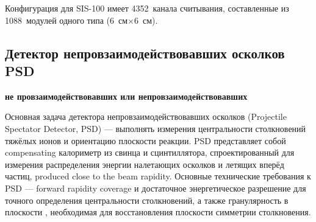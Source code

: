 
Конфигурация для SIS-100 имеет 4352~канала считывания, составленные из 1088~модулей одного типа (6~см$\times$6~см). 


\subsection{Детектор непровзаимодействовавших осколков PSD}\label{sec:secPSD}

\todo \textbf{не провзаимодействовавших или непровзаимодействовавших} \todo

Основная задача детектора непровзаимодействовавших осколков (Projectile Spectator Detector, PSD) --- выполнять измерения центральности столкновений тяжёлых ионов и ориентацию плоскости реакции. PSD представляет собой compensating \todo калориметр из свинца и сцинтиллятора, спроектированный для измерения распределения энергии налетающих осколков и летящих вперёд частиц, produced close to the beam rapidity.
Основные технические требования к PSD --- forward rapidity coverage и достаточное энергетическое разрешение для точного определения центральности столкновений, а также гранулярность в плоскости \todo, необходимая для восстановления плоскости симметрии столкновения.


